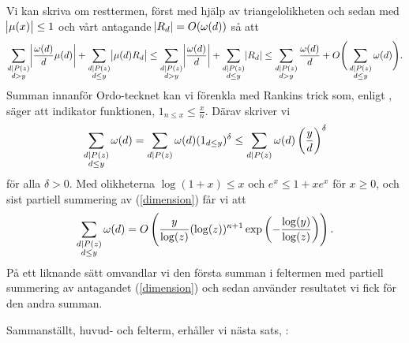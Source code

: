 Vi kan skriva om resttermen, först med hjälp av triangelolikheten och sedan med $\abs{\mu(x)} \leq 1$ och vårt antagande $\abs{R_d} = O(\omega(d))$ så att
\begin{align*}
    \sum_{\substack{d \mid P(z) \\ d > y}} \abs{\frac{\omega(d)}{d} \mu(d)} + \sum_{\substack{d \mid P(z)  \\ d \leq y}} \abs{ \mu(d) R_d} \leq 
    \sum_{\substack{d \mid P(z) \\ d > y}} \abs{\frac{\omega(d)}{d}} + \sum_{\substack{d \mid P(z)  \\ d \leq y}} \abs{R_d} \leq
    \sum_{\substack{d \mid P(z) \\ d > y}} \frac{\omega(d)}{d} + O\Bigg(\sum_{\substack{d \mid P(z)  \\ d \leq y}} \omega(d)\Bigg).
\end{align*}
Summan innanför Ordo-tecknet kan vi förenkla med Rankins trick som, enligt \cite[s.68]{cojocarumurty}, säger att indikator funktionen, \(1_{n \leq x} \leq \frac{x}{n}\). Därav skriver vi 
\begin{align*}
    \sum_{\substack{d \mid P(z)  \\ d \leq y}} \omega(d) =
    \sum_{\substack{d \mid P(z)}} \omega(d) (1_{d \leq y})^{\delta} \leq
    \sum_{\substack{d \mid P(z)}} \omega(d) \left(\frac{y}{d}\right)^{\delta}  
\end{align*}
för alla \(\delta > 0\). Med olikheterna \(\log(1 + x) \leq x\) och \(e^x \leq 1 + x e^x\) för $x \geq 0$, och sist partiell summering av (\ref{dimension}) får vi att
\begin{align*}
    \sum_{\substack{d \mid P(z)  \\ d \leq y}} \omega(d) = O\left( \frac{y}{\log(z)} (\log(z))^{\kappa + 1} \exp{\left(- \frac{\log(y)}{\log(z)} \right)} \right).
\end{align*}
På ett liknande sätt omvandlar vi den första summan i feltermen med partiell summering av antagandet (\ref{dimension}) och sedan använder resultatet vi fick för den andra summan. 

Sammanställt, huvud- och felterm, erhåller vi nästa sats, \cite[Sats 5.4.1]{cojocarumurty}:

